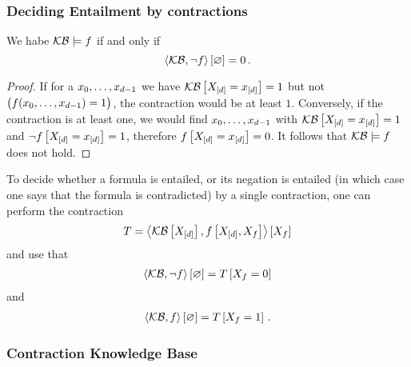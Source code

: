 %





\subsubsection{Deciding Entailment by contractions}

\begin{theorem}\label{the:contCriterionLogEntailment}
	We habe $\mathcal{KB}\models f$ if and only if 
		\[ \left\langle \mathcal{KB},\lnot f\right\rangle \left[ \varnothing \right] = 0 \, . \]
\end{theorem}
\begin{proof}
	If for a ${x_{0},\ldots,x_{d-1}}$ we have $\mathcal{KB}\left[X_{[d]}=x_{[d]}\right]=1$ but not $\big(f({x_{0},\ldots,x_{d-1}})=1\big)$, the contraction would be at least $1$.
	Conversely, if the contraction is at least one, we would find ${x_{0},\ldots,x_{d-1}}$ with $\mathcal{KB}\left[X_{[d]}=x_{[d]}\right]=1$ and $\lnot f\left[X_{[d]}=x_{[d]}\right]=1$, therefore $f\left[X_{[d]}=x_{[d]}\right]=0$. 
	It follows that $\mathcal{KB}\models f$ does not hold.
\end{proof}

To decide whether a formula is entailed, or its negation is entailed (in which case one says that the formula is contradicted) by a single contraction, one can perform the contraction
\begin{align*}
	T = \left\langle \mathcal{KB}\left[X_{[d]}\right],f\left[X_{[d]},X_{f}\right]\right\rangle \left[ X_{f} \right]
\end{align*}
and use that
\begin{align*}
	 \left\langle \mathcal{KB},\lnot f\right\rangle \left[ \varnothing \right] = T\left[X_{f}=0\right] 
\end{align*}
and 
\begin{align*}
	 \left\langle \mathcal{KB},f\right\rangle \left[ \varnothing \right] = T\left[X_{f}=1\right] \, .  
\end{align*}






\subsubsection{Contraction Knowledge Base}

